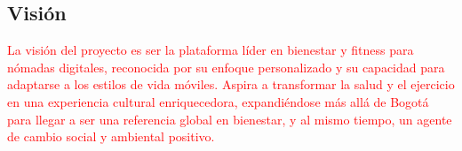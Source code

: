 \subsection{Visión}
\textcolor{red}{La visión del proyecto es ser la plataforma líder en bienestar y fitness para nómadas digitales, reconocida por su enfoque personalizado y su capacidad para adaptarse a los estilos de vida móviles. Aspira a transformar la salud y el ejercicio en una experiencia cultural enriquecedora, expandiéndose más allá de Bogotá para llegar a ser una referencia global en bienestar, y al mismo tiempo, un agente de cambio social y ambiental positivo.}